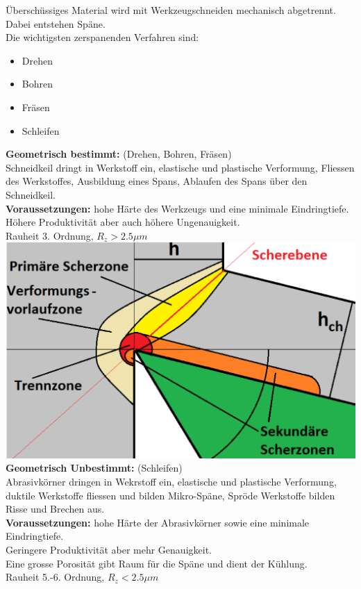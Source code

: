 Überschüssiges Material wird mit Werkzeugschneiden mechanisch abgetrennt. Dabei entstehen Späne.\\

Die wichtigsten zerspanenden Verfahren sind:
\begin{itemize}
    \item Drehen
    \item Bohren
    \item Fräsen
    \item Schleifen
\end{itemize}

\textbf{Geometrisch bestimmt:} \hfill (Drehen, Bohren, Fräsen)\\
Schneidkeil dringt in Werkstoff ein, elastische und plastische 
Verformung, Fliessen des Werkstoffes, Ausbildung eines Spans, 
Ablaufen des Spans über den Schneidkeil.\\

\textbf{Voraussetzungen:} hohe Härte des Werkzeugs und eine minimale Eindringtiefe.\\
Höhere Produktivität aber auch höhere Ungenauigkeit.\\
Rauheit 3. Ordnung, $R_z > 2.5 \mu m$\\

\includegraphics[width=0.8\linewidth]{src/images/Spanen.jpeg}\\
\textbf{Geometrisch Unbestimmt:} \hfill (Schleifen)\\
Abrasivkörner dringen in Wekrstoff ein, elastische und plastische 
Verformung, duktile Werkstoffe fliessen und bilden Mikro-Späne, 
Spröde Werkstoffe bilden Risse und Brechen aus. \\

\textbf{Voraussetzungen:} hohe Härte der Abrasivkörner sowie eine minimale Eindringtiefe.\\
Geringere Produktivität aber mehr Genauigkeit.\\
Eine grosse Porosität gibt Raum für die Späne und dient der Kühlung. \\
Rauheit 5.-6. Ordnung, $R_z < 2.5 \mu m$\\